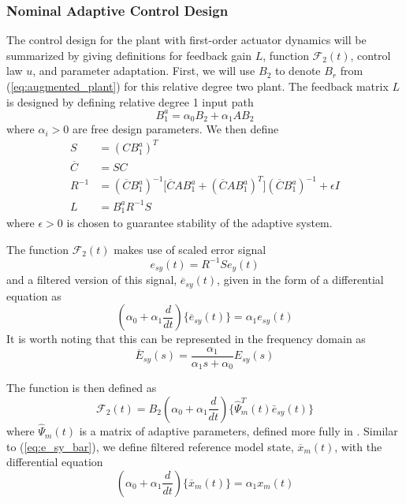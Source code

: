 \documentclass[english]{ifacconf}
\begin{document}
\subsubsection{Nominal Adaptive Control Design}
The control design for the plant with first-order actuator dynamics will be summarized by giving definitions for feedback gain $L$, function $\mathcal{F}_2(t)$, control law $u$, and parameter adaptation. First, we will use $B_2$ to denote $B_r$ from (\ref{eq:augmented_plant}) for this relative degree two plant. The feedback matrix $L$ is designed by defining relative degree 1 input path
\begin{equation}
B_1^a = \alpha_0 B_2 + \alpha_1 A B_2 \label{eq:rd2-b1a}
\end{equation}
where $\alpha_i > 0$ are free design parameters. We then define
\begin{align}
S &= (C B_1^a)^T \label{eq:S}\\	\overline{C} & = S C\\ R^{-1} &= (\overline{C} B_1^a)^{-1} \big[ \overline{C} A B_1^a + (\overline{C} A B_1^a)^T\big] (\overline{C} B_1^a)^{-1} + \epsilon I \\ L & = B_1^a R^{-1} S \label{eq:L}
\end{align}
where $\epsilon > 0$ \cite[Eq. 30]{qu2015adaptive} is chosen to guarantee stability of the adaptive system. 

The function $\mathcal{F}_2(t)$ makes use of scaled error signal
\begin{equation}
	e_{sy}(t) = R^{-1} S e_y(t) \label{eq:esy}
\end{equation}
and a filtered version of this signal, $\overline{e}_{sy}(t)$, given in the form of a differential equation as
\begin{equation}
(\alpha_0 + \alpha_1 \frac{d}{dt}) \big\{ \overline{e}_{sy}(t) \big\} = \alpha_1 e_{sy}(t) \label{eq:e_sy_bar}
\end{equation}
It is worth noting that this can be represented in the frequency domain as
\begin{equation*}
	\overline{E}_{sy}(s) = \frac{\alpha_1}{\alpha_1 s + \alpha_0} E_{sy}(s)
\end{equation*}

The function is then defined as
\begin{equation}
\mathcal{F}_2(t) = B_2 (\alpha_0 + \alpha_1 \frac{d}{dt})\big\{ \hat{\Psi}_m^T (t) \bar{e}_{sy}(t) \big\}
\end{equation}
where $\hat{\Psi}_m(t)$ is a matrix of adaptive parameters, defined more fully in \cite{qu2016adaptive}. Similar to (\ref{eq:e_sy_bar}), we define filtered reference model state, $\overline{x}_m(t)$, with the differential equation
\begin{equation}
(\alpha_0 + \alpha_1 \frac{d}{dt}) \big\{ \overline{x}_{m}(t) \big\} = \alpha_1 x_{m}(t) \label{eq:xm_bar}
\end{equation}
\end{document}
